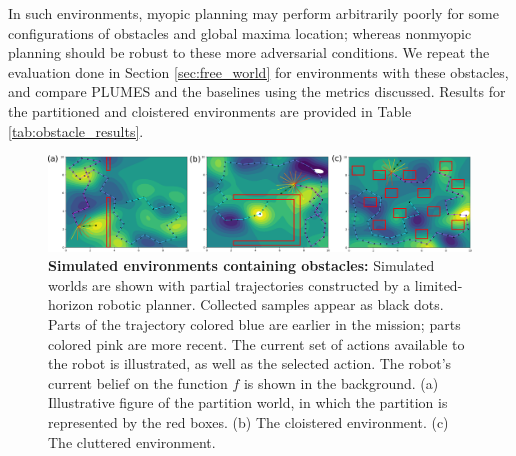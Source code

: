 \documentclass{styles/svproc}
\begin{document}
In such environments, myopic planning may perform arbitrarily poorly for some configurations of obstacles and global maxima location; whereas nonmyopic planning should be robust to these more adversarial conditions. 
We repeat the evaluation done in Section \ref{sec:free_world} for environments with these obstacles, and compare PLUMES and the baselines using the metrics discussed. Results for the partitioned and cloistered environments are provided in Table \ref{tab:obstacle_results}. 

\begin{figure}[]
    \centering
    \includegraphics[width=\columnwidth]{figures/3obstacles.png}
        \caption{\textbf{Simulated environments containing obstacles:} Simulated worlds are shown with partial trajectories constructed by a limited-horizon robotic planner. Collected samples appear as black dots. Parts of the trajectory colored blue are earlier in the mission; parts colored pink are more recent. The current set of actions available to the robot is illustrated, as well as the selected action. The robot's current belief on the function $f$ is shown in the background.  (a) Illustrative figure of the partition world, in which the partition is represented by the red boxes. (b) The cloistered environment. (c) The cluttered environment.}
    \label{fig:obstacles}
\end{figure}
\end{document}
